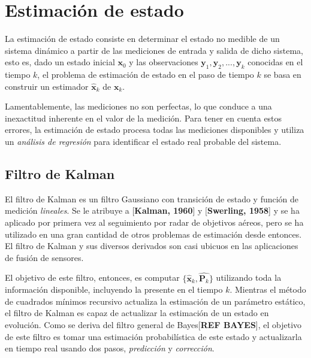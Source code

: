 \section{Estimación de estado}
\label{sec:stateestimation}
La estimación de estado consiste en determinar el estado no medible de un sistema dinámico a partir de las mediciones de entrada y salida de dicho sistema, esto es, dado un estado inicial $\bm{x}_0$ y las observaciones $\bm{y}_1, \bm{y}_2, ..., \bm{y}_k$ conocidas en el tiempo $k$, el problema de estimación de estado en el paso de tiempo $k$ se basa en construir un estimador $\hat{\bm{x}}_k$ de $\bm{x}_k$.

Lamentablemente, las mediciones no son perfectas, lo que conduce a una inexactitud inherente en el valor de la medición. Para tener en cuenta estos errores, la estimación de estado procesa todas las mediciones disponibles y utiliza un \textit{análisis de regresión} para identificar el estado real probable del sistema.

\subsection{Filtro de Kalman}
El filtro de Kalman es un filtro Gaussiano con transición de estado y función de medición \textit{lineales}. Se le atribuye a {[\textbf{Kalman, 1960}]} y {[\textbf{Swerling, 1958}]} y se ha aplicado por primera vez al seguimiento por radar de objetivos aéreos, pero se ha utilizado en una gran cantidad de otros problemas de estimación desde entonces. El filtro de Kalman y sus diversos derivados son casi ubicuos en las aplicaciones de fusión de sensores.

El objetivo de este filtro, entonces, es computar $\{\hat{\bm{x}}_k,\hat{\bm{P}_k}\}$ utilizando toda la información disponible, incluyendo la presente en el tiempo $k$. Mientras el método de cuadrados mínimos recursivo actualiza la estimación de un parámetro estático, el filtro de Kalman es capaz de actualizar la estimación de un estado en evolución. Como se deriva del filtro general de Bayes{[\textbf{REF BAYES}]}, el objetivo de este filtro es tomar una estimación probabilística de este estado y actualizarla en tiempo real usando dos pasos, \textit{predicción} y \textit{corrección}.

